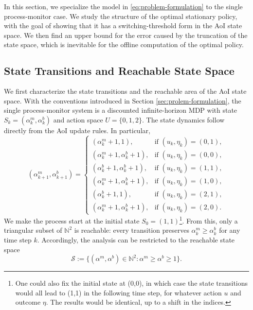 \documentclass[letterpaper,journal]{IEEEtran}
\begin{document}
In this section, we specialize the model in \eqref{eq:problem-formulation} to the single process-monitor case. We study the structure of the optimal stationary policy, with the goal of showing that it has a switching-threshold form in the AoI state space. We then find an upper bound for the error caused by the truncation of the state space, which is inevitable for the offline computation of the optimal policy.



\subsection{State Transitions and Reachable State Space}
We first characterize the state transitions and the reachable area of the AoI state space. With the conventions introduced in Section \ref{sec:prolem-formulation}, the single process-monitor system is a discounted infinite-horizon MDP with state $S_k=(\alpha^m_k,\alpha^b_k)$ and action space $U=\{0,1,2\}$. The state dynamics follow directly from the AoI update rules. In particular,
\begin{equation}\label{eq:state-evolution}
(\alpha^m_{k+1},\alpha^b_{k+1})=
\begin{cases}
	(\alpha^m_k+1,1), & \text{if } (u_k,\eta_k)=(0,1),\\
	(\alpha^m_k+1,\alpha^b_k+1), & \text{if } (u_k,\eta_k)=(0,0),\\
	(\alpha^b_k+1,\alpha^b_k+1), & \text{if } (u_k,\eta_k)=(1,1),\\
	(\alpha^m_k+1,\alpha^b_k+1), & \text{if } (u_k,\eta_k)=(1,0),\\
	(\alpha^b_k+1,1), & \text{if } (u_k,\eta_k)=(2,1),\\
	(\alpha^m_k+1,\alpha^b_k+1), & \text{if } (u_k,\eta_k)=(2,0).
\end{cases}
\end{equation}
We make the process start at the initial state $S_0=(1,1)$\footnote{One could also fix the initial state at (0,0), in which case the state transitions would all lead to (1,1) in the following time step, for whatever action $u$ and outcome $\eta$. The results would be identical, up to a shift in the indices.}. From this, only a triangular subset of $\mathbb N^2$ is reachable: every transition preserves $\alpha^m_k\geq\alpha^b_k$ for any time step $k$. Accordingly, the analysis can be restricted to the reachable state space
\[
\mathcal S:=\{(\alpha^m,\alpha^b)\in\mathbb N^2:\alpha^m\ge \alpha^b\ge 1\}.
\]
\end{document}
